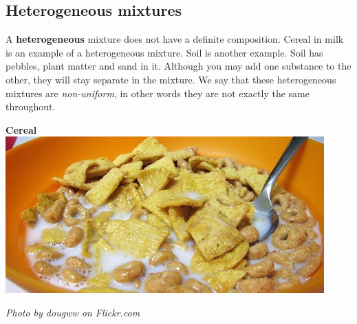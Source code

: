             \subsection*{Heterogeneous mixtures}
            \nopagebreak
A \textbf{heterogeneous} mixture does not have a definite composition. Cereal in milk is an example of a heterogeneous mixture. Soil is another example. Soil has pebbles, plant matter and sand in it. Although you may add one substance to the other, they will stay separate in the mixture. We say that these heterogeneous mixtures are \textsl{non-uniform}, in other words they are not exactly the same throughout.\\
\begin{minipage}{.5\textwidth}
\begin{center}
\textbf{Cereal}\\
 \includegraphics[width=.8\textwidth]{photos/mixtureby-dougww-flickr.jpg}\par
\textit{Photo by dougww on Flickr.com}
\end{center}
\end{minipage}
